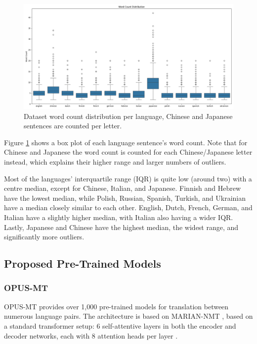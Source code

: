 \documentclass[a4paper, 11pt]{article}
\begin{document}
\begin{figure}[htbp]
    \centering
    \includegraphics[width=1\linewidth]{figures/word_count_box.png}
    \caption{Dataset word count distribution per language, Chinese and Japanese sentences are counted per letter.}
    \label{fig:word_count_box}
\end{figure}

Figure \ref{fig:word_count_box} shows a box plot of each language sentence's word count. Note that for Chinese and Japanese the word count is counted for each Chinese/Japanese letter instead, which explains their higher range and larger numbers of outliers.

Most of the languages' interquartile range (IQR) is quite low (around two) with a centre median, except for Chinese, Italian, and Japanese. Finnish and Hebrew have the lowest median, while Polish, Russian, Spanish, Turkish, and Ukrainian have a median closely similar to each other. English, Dutch, French, German, and Italian have a slightly higher median, with Italian also having a wider IQR. Lastly, Japanese and Chinese have the highest median, the widest range, and significantly more outliers.

\subsection{Proposed Pre-Trained Models}

\subsubsection{OPUS-MT}

OPUS-MT \cite{tiedemann-2023-democratizing,tiedemann-2020-opus-mt} provides over 1,000 pre-trained models for translation between numerous language pairs. The architecture is based on MARIAN-NMT \cite{mariannmt}, based on a standard transformer setup: 6 self-attentive layers in both the encoder and decoder networks, each with 8 attention heads per layer \cite{tiedemann-2020-opus-mt}.
\end{document}
